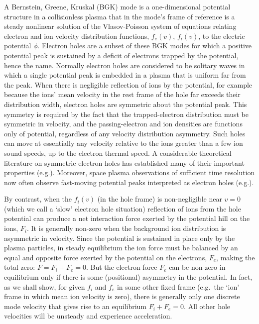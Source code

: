 \documentclass[pre]{revtex4-2}
\begin{document}
A Bernstein, Greene, Kruskal\cite{Bernstein1957} (BGK) mode is a
one-dimensional potential structure in a collisionless plasma that in
the mode's frame of reference is a steady nonlinear solution of the
Vlasov-Poisson system of equations relating electron and ion velocity
distribution functions, $f_e(v)$, $f_i(v)$, to the electric potential
$\phi$. Electron holes are a subset of these BGK modes for which a
positive potential peak is sustained by a deficit of electrons trapped
by the potential\cite{Schamel1986,Hutchinson2017}, hence the
name. Normally electron holes are considered to be solitary waves in
which a single potential peak is embedded in a plasma that is uniform
far from the peak. When there is negligible reflection of ions by the
potential, for example because the ions' mean velocity in the rest
frame of the hole far exceeds their distribution width, electron holes are
symmetric about the potential peak. This symmetry is required by the
fact that the trapped-electron distribution must be symmetric in
velocity, and the passing-electron and ion densities are functions
only of potential, regardless of any velocity distribution
asymmetry. Such holes can move at essentially any velocity relative to
the ions greater than a few ion sound speeds, up to the electron
thermal speed. A considerable theoretical literature on symmetric
electron holes has established many of their important
properties (e.g.\cite{Eliasson2006,Krasovsky2003,Dupree1982,Turikov1984,Chen2004,Ng2006,Hutchinson2018a,Hutchinson2019,Zhou2018,Hutchinson2021b}). Moreover,
space plasma observations of sufficient time resolution now often
observe fast-moving potential peaks interpreted as electron holes (e.g.\cite{Ergun1998,Ergun1999,Malaspina2013,Malaspina2014,Malaspina2018,Malaspina2019,Steinvall2019,Graham2016,Tong2018,Lotekar2020}).

By contrast, when the $f_i(v)$ (in the hole frame) is non-negligible
near $v=0$ (which we call a `slow' electron hole situation) reflection
of ions from the hole potential can produce a net interaction force
exerted by the potential hill on the ions, $F_i$. It is generally
non-zero when the background ion distribution is asymmetric in
velocity. Since the potential is sustained in place only by the plasma
particles, in steady equilibrium the ion force must be balanced by an
equal and opposite force exerted by the potential on the electrons,
$F_e$, making the total zero: $F=F_i+F_e=0$. But the electron force $F_e$
can be non-zero in equilibrium only if there is some (positional)
asymmetry in the potential. In fact, as we shall show, for given $f_i$
and $f_e$ in some other fixed frame (e.g.\ the `ion' frame in which
mean ion velocity is zero), there is generally only one discrete mode
velocity that gives rise to an equilibrium $F_i+F_e=0$. All other hole
velocities will be unsteady and experience acceleration.
\end{document}
